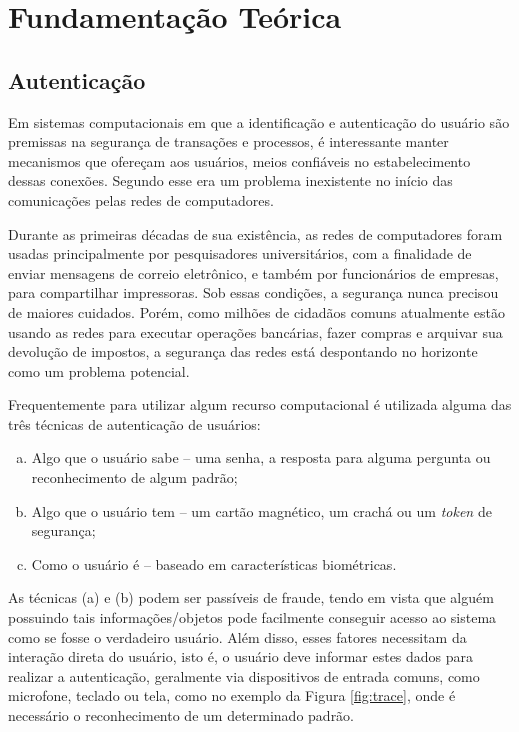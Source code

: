 \chapter{Fundamentação Teórica}\label{cha:fundamentacao}
\section{Autenticação}
Em sistemas computacionais em que a identificação e autenticação do usuário são premissas na segurança de transações e processos, é interessante manter mecanismos que ofereçam aos usuários, meios confiáveis no estabelecimento dessas conexões. Segundo \cite{tanenbaum2011computer} esse era um problema inexistente no início das comunicações pelas redes de computadores.
\begin{citacao}
Durante as primeiras décadas de sua existência, as redes de computadores foram usadas principalmente por pesquisadores universitários, com a finalidade de enviar mensagens de correio eletrônico, e também por funcionários de empresas, para compartilhar impressoras. Sob essas condições, a segurança nunca precisou de maiores cuidados. Porém, como milhões de cidadãos comuns atualmente estão usando as redes para executar operações bancárias, fazer compras e arquivar sua devolução de impostos, a segurança das redes está despontando no horizonte como um problema potencial.\cite{tanenbaum2011computer}
\end{citacao}
Frequentemente para utilizar algum recurso computacional é utilizada alguma das três técnicas de autenticação de usuários:

\begin{enumerate}[(a)]
	\item Algo que o usuário sabe – uma senha, a resposta para alguma pergunta ou reconhecimento de algum padrão;
	\item Algo que o usuário tem – um cartão magnético, um crachá ou um \textit{token} de segurança;
	\item Como o usuário é – baseado em características biométricas.
\end{enumerate}

As técnicas (a) e (b) podem ser passíveis de fraude, tendo em vista que alguém possuindo tais informações/objetos pode facilmente conseguir acesso ao sistema como se fosse o verdadeiro usuário. Além disso, esses fatores necessitam da interação direta do usuário, isto é, o usuário deve informar estes dados para realizar a autenticação, geralmente via dispositivos de entrada comuns, como microfone, teclado ou tela, como no exemplo da Figura \ref{fig:trace}, onde é necessário o reconhecimento de um determinado padrão.
\vspace{3cm}

